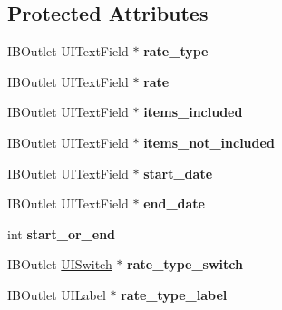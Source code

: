 \subsection*{\-Protected \-Attributes}
\begin{DoxyCompactItemize}
\item 
\hypertarget{interface_staff_out_segment2_a0c2d6b11e6d77f280281d6e1a4d1a112}{
\-I\-B\-Outlet \-U\-I\-Text\-Field $\ast$ {\bfseries rate\-\_\-type}}
\label{interface_staff_out_segment2_a0c2d6b11e6d77f280281d6e1a4d1a112}

\item 
\hypertarget{interface_staff_out_segment2_a2e0d26386eb8a2597aa176ca1eed7393}{
\-I\-B\-Outlet \-U\-I\-Text\-Field $\ast$ {\bfseries rate}}
\label{interface_staff_out_segment2_a2e0d26386eb8a2597aa176ca1eed7393}

\item 
\hypertarget{interface_staff_out_segment2_a248c6689f1503ce069bbccba8ba23762}{
\-I\-B\-Outlet \-U\-I\-Text\-Field $\ast$ {\bfseries items\-\_\-included}}
\label{interface_staff_out_segment2_a248c6689f1503ce069bbccba8ba23762}

\item 
\hypertarget{interface_staff_out_segment2_a3b069154ec0c2102c7975fd6f88c755c}{
\-I\-B\-Outlet \-U\-I\-Text\-Field $\ast$ {\bfseries items\-\_\-not\-\_\-included}}
\label{interface_staff_out_segment2_a3b069154ec0c2102c7975fd6f88c755c}

\item 
\hypertarget{interface_staff_out_segment2_aad784f1b81dc3891c3928c06315dd5a8}{
\-I\-B\-Outlet \-U\-I\-Text\-Field $\ast$ {\bfseries start\-\_\-date}}
\label{interface_staff_out_segment2_aad784f1b81dc3891c3928c06315dd5a8}

\item 
\hypertarget{interface_staff_out_segment2_aa31223ced2fdfa9fd1988980e085263c}{
\-I\-B\-Outlet \-U\-I\-Text\-Field $\ast$ {\bfseries end\-\_\-date}}
\label{interface_staff_out_segment2_aa31223ced2fdfa9fd1988980e085263c}

\item 
\hypertarget{interface_staff_out_segment2_a4f803ee5e7be55c85cb11dc3c6319688}{
int {\bfseries start\-\_\-or\-\_\-end}}
\label{interface_staff_out_segment2_a4f803ee5e7be55c85cb11dc3c6319688}

\item 
\hypertarget{interface_staff_out_segment2_afe9d6cd478606bde73976a553c6aeb02}{
\-I\-B\-Outlet \hyperlink{class_u_i_switch}{\-U\-I\-Switch} $\ast$ {\bfseries rate\-\_\-type\-\_\-switch}}
\label{interface_staff_out_segment2_afe9d6cd478606bde73976a553c6aeb02}

\item 
\hypertarget{interface_staff_out_segment2_a030f82997fb68edb81b8e63f3658bc73}{
\-I\-B\-Outlet \-U\-I\-Label $\ast$ {\bfseries rate\-\_\-type\-\_\-label}}
\label{interface_staff_out_segment2_a030f82997fb68edb81b8e63f3658bc73}

\end{DoxyCompactItemize}
